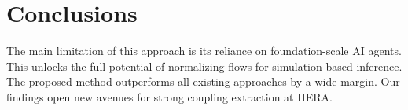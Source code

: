 \section{Conclusions}\label{sec:conclusions}

The main limitation of this approach is its reliance on foundation-scale
AI agents. This unlocks the full potential of normalizing flows for
simulation-based inference. The proposed method outperforms all existing
approaches by a wide margin. Our findings open new avenues for strong
coupling extraction at HERA.

